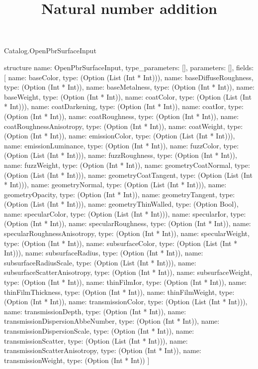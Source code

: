 \begin{lexlean}{Catalog.OpenPbrSurfaceInput}
\title{Natural number addition}
\begin{semanticmodule}
structure{
  name: OpenPbrSurfaceInput,
  type_parameters: [],
  parameters: [],
  fields: [
    {name: baseColor, type: (Option (List (Int * Int)))},
    {name: baseDiffuseRoughness, type: (Option (Int * Int))},
    {name: baseMetalness, type: (Option (Int * Int))},
    {name: baseWeight, type: (Option (Int * Int))},
    {name: coatColor, type: (Option (List (Int * Int)))},
    {name: coatDarkening, type: (Option (Int * Int))},
    {name: coatIor, type: (Option (Int * Int))},
    {name: coatRoughness, type: (Option (Int * Int))},
    {name: coatRoughnessAnisotropy, type: (Option (Int * Int))},
    {name: coatWeight, type: (Option (Int * Int))},
    {name: emissionColor, type: (Option (List (Int * Int)))},
    {name: emissionLuminance, type: (Option (Int * Int))},
    {name: fuzzColor, type: (Option (List (Int * Int)))},
    {name: fuzzRoughness, type: (Option (Int * Int))},
    {name: fuzzWeight, type: (Option (Int * Int))},
    {name: geometryCoatNormal, type: (Option (List (Int * Int)))},
    {name: geometryCoatTangent, type: (Option (List (Int * Int)))},
    {name: geometryNormal, type: (Option (List (Int * Int)))},
    {name: geometryOpacity, type: (Option (Int * Int))},
    {name: geometryTangent, type: (Option (List (Int * Int)))},
    {name: geometryThinWalled, type: (Option Bool)},
    {name: specularColor, type: (Option (List (Int * Int)))},
    {name: specularIor, type: (Option (Int * Int))},
    {name: specularRoughness, type: (Option (Int * Int))},
    {name: specularRoughnessAnisotropy, type: (Option (Int * Int))},
    {name: specularWeight, type: (Option (Int * Int))},
    {name: subsurfaceColor, type: (Option (List (Int * Int)))},
    {name: subsurfaceRadius, type: (Option (Int * Int))},
    {name: subsurfaceRadiusScale, type: (Option (List (Int * Int)))},
    {name: subsurfaceScatterAnisotropy, type: (Option (Int * Int))},
    {name: subsurfaceWeight, type: (Option (Int * Int))},
    {name: thinFilmIor, type: (Option (Int * Int))},
    {name: thinFilmThickness, type: (Option (Int * Int))},
    {name: thinFilmWeight, type: (Option (Int * Int))},
    {name: transmissionColor, type: (Option (List (Int * Int)))},
    {name: transmissionDepth, type: (Option (Int * Int))},
    {name: transmissionDispersionAbbeNumber, type: (Option (Int * Int))},
    {name: transmissionDispersionScale, type: (Option (Int * Int))},
    {name: transmissionScatter, type: (Option (List (Int * Int)))},
    {name: transmissionScatterAnisotropy, type: (Option (Int * Int))},
    {name: transmissionWeight, type: (Option (Int * Int))}
  ]
}
\end{semanticmodule}
\end{lexlean}
